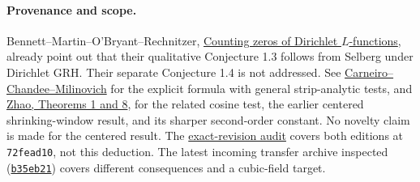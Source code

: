 \documentclass[11pt]{article}
\begin{document}
\paragraph{Provenance and scope.}
Bennett--Martin--O'Bryant--Rechnitzer, \href{https://doi.org/10.1090/mcom/3599}{Counting zeros of Dirichlet \(L\)-functions},
already point out that their qualitative Conjecture 1.3 follows from Selberg under
Dirichlet GRH. Their separate Conjecture 1.4 is not addressed.
See \href{https://arxiv.org/abs/1503.00955}{Carneiro--Chandee--Milinovich} for the
explicit formula with general strip-analytic tests, and
\href{https://arxiv.org/abs/2503.15832}{Zhao, Theorems 1 and 8}, for the related
cosine test, the earlier centered shrinking-window result, and its sharper
second-order constant. No novelty claim is made for the centered result.
The \href{https://math.mit.edu/~drew/shortgrh/}{exact-revision audit}
covers both editions at \texttt{72fead10}, not this deduction.
The latest incoming transfer archive inspected
(\href{https://github.com/VladimirReshetnikov/ProveIt/commit/b35eb211b859d2883c98ef71fbe47e1fcbcc4a74}{\texttt{b35eb21}})
covers different consequences and a cubic-field target.
\end{document}
